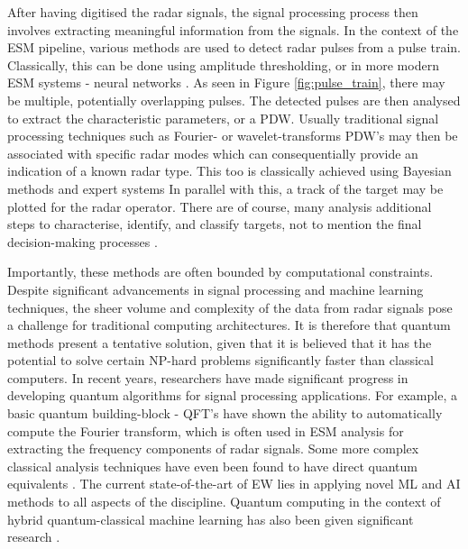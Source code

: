 After having digitised the radar signals, the signal processing process then involves extracting meaningful information from the signals. 
In the context of the \ac{ESM} pipeline, various methods are used to detect radar pulses from a pulse train. 
Classically, this can be done using amplitude thresholding, or in more modern \ac{ESM} systems - neural networks \cite{liu_classification_2019, alhashimi_deinterleaving_2007}.
As seen in Figure \ref{fig:pulse_train}, there may be multiple, potentially overlapping pulses.
The detected pulses are then analysed to extract the characteristic parameters, or a \ac{PDW}.
Usually traditional signal processing techniques such as Fourier- or wavelet-transforms \cite{ehara_weak_1994, gulum_parameter_2012}
\ac{PDW}'s may then be associated with specific radar modes which can consequentially provide an indication of a known radar type.
This too is classically achieved using Bayesian methods \cite{matuszewski_knowledge-based_2008} and expert systems \cite{miah_expert_1999}
In parallel with this, a track of the target may be plotted for the radar operator.
There are of course, many analysis additional steps to characterise, identify, and classify targets, not to mention the final decision-making processes \cite{charlish_development_2020}.

Importantly, these methods are often bounded by computational constraints.
Despite significant advancements in signal processing and machine learning techniques, the sheer volume and complexity of the data from radar signals pose a challenge for traditional computing architectures.
It is therefore that quantum methods present a tentative solution, given that it is believed that it has the potential to solve certain NP-hard problems significantly faster than classical computers.
In recent years, researchers have made significant progress in developing quantum algorithms for signal processing applications.
For example, a basic quantum building-block - \ac{QFT}'s have shown the ability to automatically compute the Fourier transform, which is often used in \ac{ESM} analysis for extracting the frequency components of radar signals.
Some more complex classical analysis techniques have even been found to have direct quantum equivalents \cite{hoyer_efficient_1997, ma_quantum_2021, fijany_quantum_1998, nimbe_models_2021}.
The current state-of-the-art of \ac{EW} lies in applying novel \ac{ML} and \ac{AI} methods to all aspects of the discipline.
Quantum computing in the context of hybrid quantum-classical machine learning has also been given significant research \cite{sim_expressibility_2019, schuld_quest_2014}.

